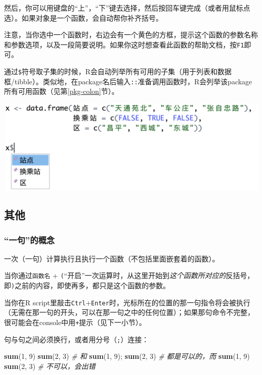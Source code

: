 \documentclass[]{book}
\newenvironment{Shaded}{\begin{snugshade}}{\end{snugshade}}
\newcommand{\CommentTok}[1]{\textcolor[rgb]{0.56,0.35,0.01}{\textit{#1}}}
\newcommand{\DecValTok}[1]{\textcolor[rgb]{0.00,0.00,0.81}{#1}}
\newcommand{\KeywordTok}[1]{\textcolor[rgb]{0.13,0.29,0.53}{\textbf{#1}}}
\newcommand{\NormalTok}[1]{#1}
\begin{document}
然后，你可以用键盘的``上''，``下''键去选择，然后按回车键完成（或者用鼠标点选）。如果对象是一个函数，会自动帮你补齐括号。

注意，当你选中一个函数时，右边会有一个黄色的方框，提示这个函数的参数名称和参数选项，以及一段简要说明。如果你这时想查看此函数的帮助文档，按\texttt{F1}即可。

通过\texttt{\$}符号取子集的时候，R会自动列举所有可用的子集（用于列表和数据框/tibble）。类似地，在package名后输入\texttt{::}准备调用函数时，R会列举该package所有可用函数（见第\ref{pkg-colon}节）。

\includegraphics[width=1\linewidth]{img/rstudio-fuli/auto-sub}

\hypertarget{misc}{%
\subsection{其他}\label{misc}}

\subsubsection{``一句''的概念}

一次（一句）计算执行且执行一个函数（不包括里面嵌套着的函数）。

当你通过\texttt{函数名} + \texttt{(}``开启''一次运算时，从这里开始到\emph{这个函数所对应的}反括号，即\texttt{)}之前的内容，即使再多，都只是这个函数的参数。

当你在R script里敲击\texttt{Ctrl}+\texttt{Enter}时，光标所在的位置的那一句指令将会被执行（无需在那一句的开头，可以在那一句之中的任何位置）；如果那句命令不完整，很可能会在console中用\texttt{+}提示（见下一小节）。

句与句之间必须换行，或者用分号（\texttt{;}）连接：

\begin{Shaded}
\begin{Highlighting}[]
\KeywordTok{sum}\NormalTok{(}\DecValTok{1}\NormalTok{, }\DecValTok{9}\NormalTok{)}
\KeywordTok{sum}\NormalTok{(}\DecValTok{2}\NormalTok{, }\DecValTok{3}\NormalTok{)}
\CommentTok{# 和}
\KeywordTok{sum}\NormalTok{(}\DecValTok{1}\NormalTok{, }\DecValTok{9}\NormalTok{); }\KeywordTok{sum}\NormalTok{(}\DecValTok{2}\NormalTok{, }\DecValTok{3}\NormalTok{)}
\CommentTok{# 都是可以的，而}
\KeywordTok{sum}\NormalTok{(}\DecValTok{1}\NormalTok{, }\DecValTok{9}\NormalTok{) }\KeywordTok{sum}\NormalTok{(}\DecValTok{2}\NormalTok{, }\DecValTok{3}\NormalTok{)}
\CommentTok{# 不可以，会出错}
\end{Highlighting}
\end{Shaded}
\end{document}
